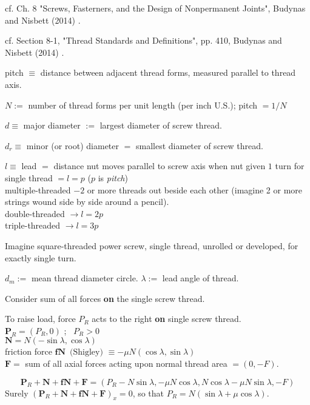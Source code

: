 \documentclass[10pt]{amsart}
\begin{document}
\begin{multicols*}{2}
cf. Ch. 8 "Screws, Fasterners, and the Design of Nonpermanent Joints", Budynas and Nisbett (2014) \cite{BuNi2014}.  

cf. Section 8-1, "Thread Standards and Definitions", pp. 410, Budynas and Nisbett (2014) \cite{BuNi2014}.  
 
pitch $\equiv $ distance between adjacent thread forms, measured parallel to thread axis.  

$N :=$ number of thread forms per unit length (per inch U.S.); pitch $=1/N$  

$d\equiv $ major diameter $:=$ largest diameter of screw thread.  

$d_r \equiv $ minor (or root) diameter $=$ smallest diameter of screw thread.  

$l \equiv $ lead $=$ distance nut moves parallel to screw axis when nut given $1$ turn for \\
single thread $=l=p$ ($p$ is \emph{pitch}) \\
multiple-threaded $- 2 $ or more threads out beside each other (imagine 2 or more strings wound side by side around a pencil).  \\
double-threaded $\to l = 2p$  \\
triple-threaded $\to l=3p$  

Imagine square-threaded power screw, single thread, unrolled or developed, for exactly single turn.  

$d_m:= $ mean thread diameter circle.  $\lambda := $ lead angle of thread.  

Consider sum of all forces \textbf{on} the single screw thread.  

To raise load, force $P_R$ acts to the right \textbf{on} single screw thread.   \\
$\mathbf{P}_R = (P_R,0)$ ; \, $P_R >0$ \\
$\mathbf{N}= N (-\sin{\lambda}, \cos{\lambda} )$  \\ 
friction force $\mathbf{fN} \, \text{ (Shigley) } \equiv - \mu N(\cos{\lambda}, \sin{\lambda})$ \\
$\mathbf{F} =$ sum of all axial forces acting upon normal thread area $=(0,-F)$.  

\begin{equation}
	\mathbf{P}_R + \mathbf{N} + \mathbf{fN} + \mathbf{F} = (P_R-N\sin{\lambda} , - \mu N \cos{\lambda}, N\cos{\lambda} - \mu N\sin{\lambda}, -F)
\end{equation}
Surely $(\mathbf{P}_R + \mathbf{N} + \mathbf{fN} + \mathbf{F})_x =0$, so that $P_R = N( \sin{\lambda} + \mu \cos{\lambda})$.  


\end{multicols*}
\end{document}
